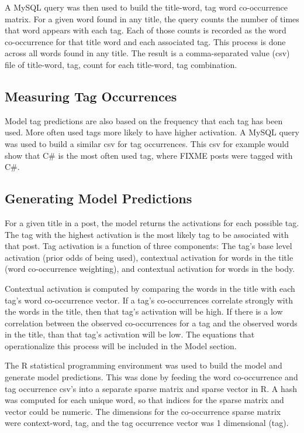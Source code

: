 \documentclass[10pt,letterpaper]{article}
\begin{document}
A MySQL query was then used to build the title-word, tag word co-occurrence matrix.
For a given word found in any title, the query counts the number of times that word appears with each tag.
Each of those counts is recorded as the word co-occurrence for that title word and each associated tag.
This process is done across all words found in any title.
The result is a comma-separated value (csv) file of title-word, tag, count for each title-word, tag combination.

\subsection{Measuring Tag Occurrences}

Model tag predictions are also based on the frequency that each tag has been used.
More often used tags more likely to have higher activation.
A MySQL query was used to build a similar csv for tag occurrences.
This csv for example would show that C\# is the most often used tag, where FIXME posts were tagged with C\#.

\subsection{Generating Model Predictions}

For a given title in a post, the model returns the activations for each possible tag.
The tag with the highest activation is the most likely tag to be associated with that post.
Tag activation is a function of three components:
The tag's base level activation (prior odds of being used),
contextual activation for words in the title (word co-occurrence weighting),
and contextual activation for words in the body.

Contextual activation is computed by comparing the words in the title with each tag's word co-occurrence vector.
If a tag's co-occurrences correlate strongly with the words in the title, then that tag's activation will be high.
If there is a low correlation between the observed co-occurrences for a tag and the observed words in the title, than that tag's activation will be low.
The equations that operationalize this process will be included in the Model section.

The R statistical programming environment was used to build the model and generate model predictions.
This was done by feeding the word co-occurrence and tag occurrence csv's into a separate sparse matrix and sparse vector in R.
A hash was computed for each unique word, so that indices for the sparse matrix and vector could be numeric.
The dimensions for the co-occurrence sparse matrix were context-word, tag, and the tag occurrence vector was 1 dimensional (tag).
\end{document}
